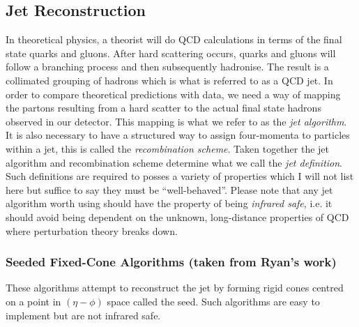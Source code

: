 \documentclass{article}
\begin{document}
\subsection{Jet Reconstruction}
In theoretical physics, a theorist will do QCD calculations in terms of the final state quarks and gluons. After hard scattering occurs, quarks and gluons will follow a branching process and then subsequently hadronise. The result is a collimated grouping of hadrons which is what is referred to as a QCD jet. In order to compare theoretical predictions with data, we need a way of mapping the partons resulting from a hard scatter to the actual final state hadrons observed in our detector. This mapping is what we refer to as the \emph{jet algorithm}. It is also necessary to have a structured way to assign four-momenta to particles within a jet, this is called the \emph{recombination scheme}. Taken together the jet algorithm and recombination scheme determine what we call the \emph{jet definition}. Such definitions are required to posses a variety of properties which I will not list here but suffice to say they must be ``well-behaved''. Please note that any jet algorithm worth using should have the property of being \emph{infrared safe}, i.e. it should avoid being dependent on the unknown, long-distance properties of QCD where perturbation theory breaks down.
\subsubsection{Seeded Fixed-Cone Algorithms (taken from Ryan's work)}
These algorithms attempt to reconstruct the jet by forming rigid cones centred on a point in $(\eta-\phi)$ space called the seed. Such algorithms are easy to implement but are not infrared safe.
\end{document}
